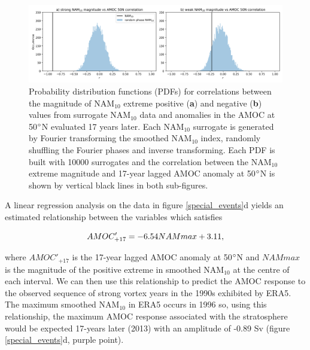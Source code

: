 \begin{center}
\begin{figure}[h!]
\noindent\includegraphics[width = \linewidth]{Figures/Figures-surface/correlation_stat_sigs.png}
\caption[PDFs for correlations between the magnitude of NAM$_{10}$ extreme and lagged AMOC]{Probability distribution functions (PDFs) for correlations between the magnitude of NAM$_{10}$ extreme positive (\textbf{a}) and negative (\textbf{b}) values from surrogate NAM$_{10}$ data and anomalies in the AMOC at 50$\degree$N evaluated 17 years later. Each NAM$_{10}$ surrogate is generated by Fourier transforming the smoothed NAM$_{10}$ index, randomly shuffling the Fourier phases and inverse transforming. Each PDF is built with 10000 surrogates and the correlation between the NAM$_{10}$ extreme magnitude and 17-year lagged AMOC anomaly at 50$\degree$N is shown by vertical black lines in both sub-figures.}
\label{cors_stat_sigs}
\end{figure}
\end{center}

A linear regression analysis on the data in figure \ref{special_events}d yields an estimated relationship between the variables which satisfies

\begin{equation}
AMOC'_{+17} = -6.54\space NAM max + 3.11,
\end{equation}

\noindent where $AMOC'_{+17}$ is the 17-year lagged AMOC anomaly at 50$\degree$N and $NAM max$ is the magnitude of the positive extreme in smoothed NAM$_{10}$ at the centre of each interval. We can then use this relationship to predict the AMOC response to the observed sequence of strong vortex years in the 1990s exhibited by ERA5. The maximum smoothed NAM$_{10}$ in ERA5 occurs in 1996 so, using this relationship, the maximum AMOC response associated with the stratosphere would be expected 17-years later (2013) with an amplitude of -0.89 Sv (figure \ref{special_events}d, purple point).

